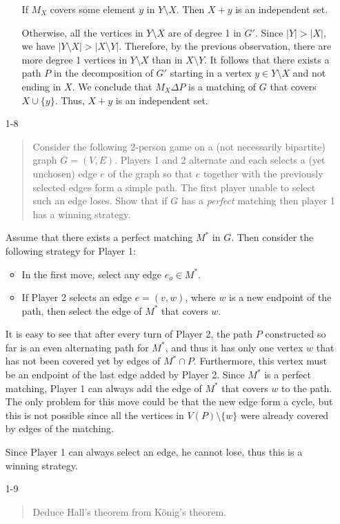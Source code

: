 \documentclass[12pt]{article}
\begin{document}
\begin{enumerate}
\begin{enumerate}
If $M_X$ covers some element $y$ in $Y\setminus X$. Then $X+ y$ is an
independent set.

Otherwise, all the vertices in $Y\setminus X$ are of degree 1 in
$G'$. Since $|Y| > |X|$, we have $|Y\setminus X| > |X\setminus
Y|$. Therefore, by the previous observation, there are more degree 1
vertices in $Y\setminus X$ than in $X \setminus Y$. It follows that
there exists a path $P$ in the decomposition of $G'$ starting in a
vertex $y \in Y\setminus X$ and not ending in $X$. We conclude that
$M_X \Delta P$ is a matching of $G$ that covers $X \cup \{y\}$. Thus,
$X + y$ is an independent set.
\end{enumerate}

\item[1-8] %
\begin{quote}
Consider the following 2-person game on a (not necessarily bipartite)
graph $G=(V,E)$. Players 1 and 2 alternate and each selects a (yet
unchosen) edge $e$ of the graph so that $e$ together with the
previously selected edges form a simple path. The first player unable
to select such an edge loses. Show that if $G$ has a {\it perfect}
matching then player 1 has a winning strategy. 
\end{quote}

Assume that there exists a perfect matching $M^*$
  in $G$. Then consider the following strategy for Player 1:
\begin{itemize}
\item In the first move, select any edge $e_o \in M^*$.
\item If Player 2 selects an edge $e = (v,w)$, where $w$ is a new
  endpoint of the path, then select the edge of $M^*$ that covers $w$.
\end{itemize}
	
It is easy to see that after every turn of Player 2, the path $P$
constructed so far is an even alternating path for $M^*$, and thus it
has only one vertex $w$ that has not been covered yet by edges of
$M^*\cap P$. Furthermore, this vertex must be an endpoint of the last
edge added by Player 2.  Since $M^*$ is a perfect matching, Player 1
can always add the edge of $M^*$ that covers $w$ to the path. The only
problem for this move could be that the new edge form a cycle, but
this is not possible since all the vertices in $V(P)\setminus \{w\}$
were already covered by edges of the matching.

Since Player 1 can always select an edge, he cannot lose, thus this is
a winning strategy.
\item[1-9] %
\begin{quote}
Deduce Hall's theorem from K\"onig's theorem.
\end{quote}


\end{enumerate}
\end{document}
